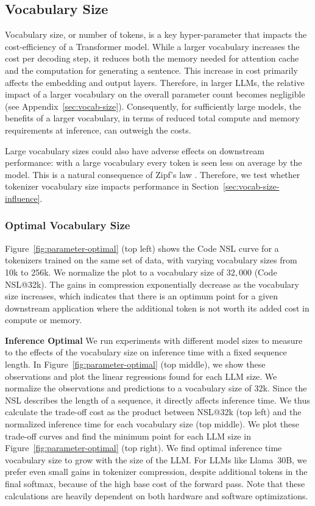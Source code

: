 \subsection{Vocabulary Size}

Vocabulary size, or number of tokens, is a key hyper-parameter that impacts the cost-efficiency of a Transformer model. While a larger vocabulary increases the cost per decoding step, it reduces both the memory needed for attention cache and the computation for generating a sentence. This increase in cost primarily affects the embedding and output layers. Therefore, in larger LLMs, the relative impact of a larger vocabulary on the overall parameter count becomes negligible (see Appendix~\ref{sec:vocab-size}). 
Consequently, for sufficiently large models, the benefits of a larger vocabulary, in terms of reduced total compute and memory requirements at inference, can outweigh the costs.

Large vocabulary sizes could also have adverse effects on downstream performance: with a large vocabulary every token is seen less on average by the model. This is a natural consequence of Zipf's law \cite{zipf1949human}. Therefore, we test whether tokenizer vocabulary size impacts performance in Section~\ref{sec:vocab-size-influence}.

\subsubsection{Optimal Vocabulary Size}
\label{sec:optimal-size}

Figure~\ref{fig:parameter-optimal} (top left) shows the Code NSL curve for a tokenizers trained on the same set of data, with varying vocabulary sizes from 10k to 256k. We normalize the plot to a vocabulary size of $32,000$ (Code NSL@32k). The gains in compression exponentially decrease as the vocabulary size increases, which indicates that there is an optimum point for a given downstream application where the additional token is not worth its added cost in compute or memory.

\textbf{Inference Optimal} We run experiments with different model sizes to measure to the effects of the vocabulary size on inference time with a fixed sequence length. In Figure~\ref{fig:parameter-optimal} (top middle), we show these observations and plot the linear regressions found for each LLM size. We normalize the observations and predictions to a vocabulary size of 32k. Since the NSL describes the length of a sequence, it directly affects inference time. We thus calculate the trade-off cost as the product between NSL@32k (top left) and the normalized inference time for each vocabulary size (top middle). We plot these trade-off curves and find the minimum point for each LLM size in Figure~\ref{fig:parameter-optimal} (top right). We find optimal inference time vocabulary size to grow with the size of the LLM. For LLMs like Llama~30B, we prefer even small gains in tokenizer compression, despite additional tokens in the final softmax, because of the high base cost of the forward pass. Note that these calculations are heavily dependent on both hardware and software optimizations.

